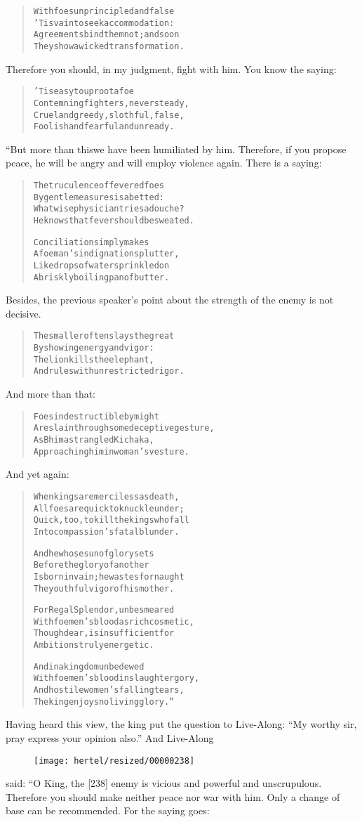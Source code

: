 \documentclass[article, twoside, 10pt]{memoir}
\renewenvironment{verbatim}{%
\begin{quote}%
\vskip -10pt%
\begin{alltt}\normalfont\small}{\end{alltt}%
\end{quote}%
\vskip -10pt
} %
\begin{document}
\begin{verbatim}
With foes unprincipled and false
    'Tis vain to seek accommodation:
Agreements bind them not; and soon
    They show a wicked transformation.
\end{verbatim}
Therefore you should, in my judgment, fight with him. You know the
saying:

\begin{verbatim}
'Tis easy to uproot a foe
    Contemning fighters, never steady,
Cruel and greedy, slothful, false,
    Foolish and fearful and unready.
\end{verbatim}
“But more than this{\textemdash}we have been humiliated by him. Therefore, if
you propose peace, he will be angry and will employ violence again.
There is a saying:

\begin{verbatim}
The truculence of fevered foes
    By gentle measures is abetted:
What wise physician tries a douche?
    He knows that fever should be sweated.

Conciliation simply makes
    A foeman's indignation splutter,
Like drops of water sprinkled on
    A briskly boiling pan of butter.
\end{verbatim}
Besides, the previous speaker's point about the strength of the
enemy is not decisive.

\begin{verbatim}
The smaller often slays the great
    By showing energy and vigor:
The lion kills the elephant,
    And rules with unrestricted rigor.
\end{verbatim}
And more than that:

\begin{verbatim}
Foes indestructible by might
    Are slain through some deceptive gesture,
As Bhima strangled Kichaka,
    Approaching him in woman's vesture.
\end{verbatim}
And yet again:

\begin{verbatim}
When kings are merciless as death,
    All foes are quick to knuckle under;
Quick, too, to kill the kings who fall
    Into compassion's fatal blunder.

And he whose sun of glory sets
    Before the glory of another
Is born in vain; he wastes for naught
    The youthful vigor of his mother.

For Regal Splendor, unbesmeared
    With foemen's blood as rich cosmetic,
Though dear, is insufficient for
    Ambitions truly energetic.

And in a kingdom unbedewed
    With foemen's blood in slaughter gory,
And hostile women's falling tears,
    The king enjoys no living glory.”
\end{verbatim}
Having heard this view, the king put the question to Live-Along:
``My worthy sir, pray express your opinion also.'' And Live-Along
\begin{figure}[p]\texttt{[image: hertel/resized/00000238]}\end{figure}said: “O King, the [238] enemy is vicious and powerful and
unscrupulous. Therefore you should make neither peace nor war with
him. Only a change of base can be recommended. For the saying
goes:
\end{document}
